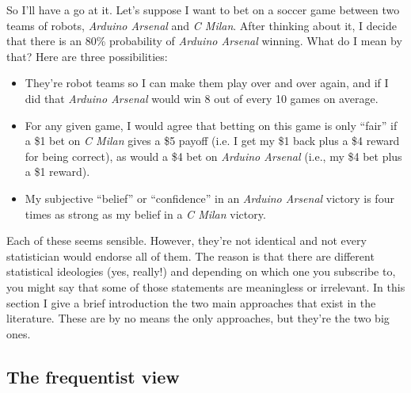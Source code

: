 So I'll have a go at it. Let's suppose I want to bet on a soccer game between two teams of robots, {\it Arduino Arsenal} and {\it C Milan}. After thinking about it, I decide that there is an 80\% probability of {\it Arduino Arsenal} winning. What do I mean by that? Here are three possibilities:
\begin{itemize}
\item They're robot teams so I can make them play over and over again, and if I did that {\it Arduino Arsenal} would win 8 out of every 10 games on average.
\item For any given game, I would agree that betting on this game is only ``fair'' if a \$1 bet on {\it C Milan} gives a \$5 payoff (i.e. I get my \$1 back plus a \$4 reward for being correct), as would a \$4 bet on {\it Arduino Arsenal} (i.e., my \$4 bet plus a \$1 reward). 
\item My subjective ``belief'' or ``confidence'' in an {\it Arduino Arsenal} victory is four times as strong as my belief in a {\it C Milan} victory.
\end{itemize}
Each of these seems sensible. However, they're not identical and not every statistician would endorse all of them. The reason is that there are different statistical ideologies (yes, really!) and depending on which one you subscribe to, you might say that some of those statements are meaningless or irrelevant. In this section I give a brief introduction the two main approaches that exist in the literature. These are by no means the only approaches, but they're the two big ones. 

\subsection{The frequentist view}

